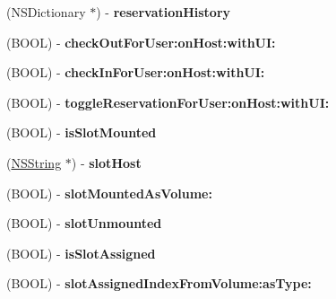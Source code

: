 \begin{DoxyCompactItemize}
\item 
\hypertarget{interface_d_a_c_a_l_slot_ad81fe0da889ba317f506e11ca919e8e5}{
(NSDictionary $\ast$) -\/ {\bfseries reservationHistory}}
\label{interface_d_a_c_a_l_slot_ad81fe0da889ba317f506e11ca919e8e5}

\item 
\hypertarget{interface_d_a_c_a_l_slot_a6be032c8e658a14d2871cdfd888008f2}{
(BOOL) -\/ {\bfseries checkOutForUser:onHost:withUI:}}
\label{interface_d_a_c_a_l_slot_a6be032c8e658a14d2871cdfd888008f2}

\item 
\hypertarget{interface_d_a_c_a_l_slot_a9a429ab157f2a8a8904f777398718bfb}{
(BOOL) -\/ {\bfseries checkInForUser:onHost:withUI:}}
\label{interface_d_a_c_a_l_slot_a9a429ab157f2a8a8904f777398718bfb}

\item 
\hypertarget{interface_d_a_c_a_l_slot_a1efc5af0a44c92908920e60186990974}{
(BOOL) -\/ {\bfseries toggleReservationForUser:onHost:withUI:}}
\label{interface_d_a_c_a_l_slot_a1efc5af0a44c92908920e60186990974}

\item 
\hypertarget{interface_d_a_c_a_l_slot_a99762625e98456cb5b844597edea7c6a}{
(BOOL) -\/ {\bfseries isSlotMounted}}
\label{interface_d_a_c_a_l_slot_a99762625e98456cb5b844597edea7c6a}

\item 
\hypertarget{interface_d_a_c_a_l_slot_a6b2963d5e55d89a65dc22b705fb24a09}{
(\hyperlink{class_n_s_string}{NSString} $\ast$) -\/ {\bfseries slotHost}}
\label{interface_d_a_c_a_l_slot_a6b2963d5e55d89a65dc22b705fb24a09}

\item 
\hypertarget{interface_d_a_c_a_l_slot_aa7650ac8022f2eb608417b30456ec018}{
(BOOL) -\/ {\bfseries slotMountedAsVolume:}}
\label{interface_d_a_c_a_l_slot_aa7650ac8022f2eb608417b30456ec018}

\item 
\hypertarget{interface_d_a_c_a_l_slot_aac49acf5f0c222d2dd9b09bf45946ac1}{
(BOOL) -\/ {\bfseries slotUnmounted}}
\label{interface_d_a_c_a_l_slot_aac49acf5f0c222d2dd9b09bf45946ac1}

\item 
\hypertarget{interface_d_a_c_a_l_slot_ae6e02a7506baca03f27e900af992b47b}{
(BOOL) -\/ {\bfseries isSlotAssigned}}
\label{interface_d_a_c_a_l_slot_ae6e02a7506baca03f27e900af992b47b}

\item 
\hypertarget{interface_d_a_c_a_l_slot_ac21a1cff3e100f6f8517f3232945dd75}{
(BOOL) -\/ {\bfseries slotAssignedIndexFromVolume:asType:}}
\label{interface_d_a_c_a_l_slot_ac21a1cff3e100f6f8517f3232945dd75}


\end{DoxyCompactItemize}
